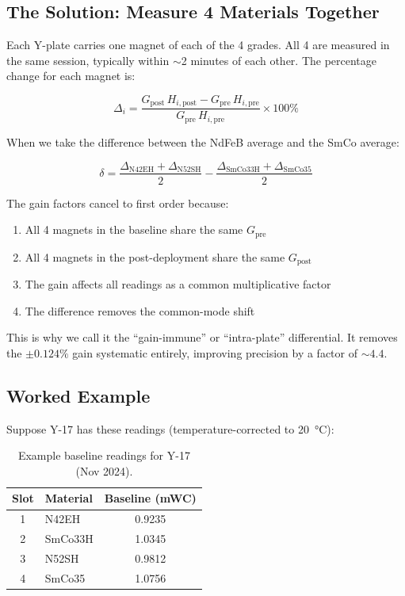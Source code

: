 \documentclass[11pt,letterpaper]{article}
\begin{document}
\subsection{The Solution: Measure 4 Materials Together}

Each Y-plate carries one magnet of each of the 4 grades. All 4 are measured in
the same session, typically within ${\sim}$2 minutes of each other. The
percentage change for each magnet is:

\begin{equation*}
\Delta_i = \frac{G_{\mathrm{post}}\,H_{i,\mathrm{post}} - G_{\mathrm{pre}}\,H_{i,\mathrm{pre}}}
                {G_{\mathrm{pre}}\,H_{i,\mathrm{pre}}} \times 100\%
\end{equation*}

When we take the difference between the NdFeB average and the SmCo average:

\begin{equation*}
\delta = \frac{\Delta_{\mathrm{N42EH}} + \Delta_{\mathrm{N52SH}}}{2}
       - \frac{\Delta_{\mathrm{SmCo33H}} + \Delta_{\mathrm{SmCo35}}}{2}
\end{equation*}

The gain factors cancel to first order because:
\begin{enumerate}[nosep]
  \item All 4 magnets in the baseline share the same $G_{\mathrm{pre}}$
  \item All 4 magnets in the post-deployment share the same $G_{\mathrm{post}}$
  \item The gain affects all readings as a common multiplicative factor
  \item The difference removes the common-mode shift
\end{enumerate}

This is why we call it the ``gain-immune'' or ``intra-plate'' differential. It
removes the $\pm 0.124\%$ gain systematic entirely, improving precision by a
factor of ${\sim}4.4$.

\subsection{Worked Example}

Suppose Y-17 has these readings (temperature-corrected to \SI{20}{\degreeCelsius}):

\begin{table}[htbp]
\centering
\caption{Example baseline readings for Y-17 (Nov 2024).}
\label{tab:diff-baseline}
\begin{tabular}{@{}clc@{}}
\toprule
Slot & Material & Baseline (mWC) \\
\midrule
1 & N42EH   & 0.9235 \\
2 & SmCo33H & 1.0345 \\
3 & N52SH   & 0.9812 \\
4 & SmCo35  & 1.0756 \\
\bottomrule
\end{tabular}
\end{table}
\end{document}
